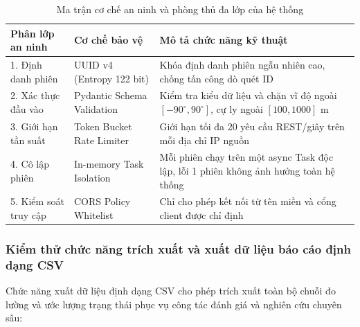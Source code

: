 \begin{table}[H]
\centering
\caption{Ma trận cơ chế an ninh và phòng thủ đa lớp của hệ thống}
\label{tab:security-mechanisms-matrix}
\begin{tabularx}{\linewidth}{ll>{\RaggedRight}X}
\toprule
\textbf{Phân lớp an ninh} & \textbf{Cơ chế bảo vệ} & \textbf{Mô tả chức năng kỹ thuật} \\
\midrule
1. Định danh phiên & UUID v4 (Entropy 122 bit) & Khóa định danh phiên ngẫu nhiên cao, chống tấn công dò quét ID \\
2. Xác thực đầu vào & Pydantic Schema Validation & Kiểm tra kiểu dữ liệu và chặn vĩ độ ngoài $[-90^\circ, 90^\circ]$, cự ly ngoài $[100, 1000]$ m \\
3. Giới hạn tần suất & Token Bucket Rate Limiter & Giới hạn tối đa 20 yêu cầu REST/giây trên mỗi địa chỉ IP nguồn \\
4. Cô lập phiên & In-memory Task Isolation & Mỗi phiên chạy trên một async Task độc lập, lỗi 1 phiên không ảnh hưởng toàn hệ thống \\
5. Kiểm soát truy cập & CORS Policy Whitelist & Chỉ cho phép kết nối từ tên miền và cổng client được chỉ định \\
\bottomrule
\end{tabularx}
\end{table}



\subsubsection{Kiểm thử chức năng trích xuất và xuất dữ liệu báo cáo định dạng CSV}

\hspace{0.5cm} Chức năng xuất dữ liệu định dạng CSV cho phép trích xuất toàn bộ chuỗi đo lường và ước lượng trạng thái phục vụ công tác đánh giá và nghiên cứu chuyên sâu:

\begin{table}[H]
\centering
\caption{Kiểm tra tính toàn vẹn và dung lượng tệp CSV xuất theo thời lượng phiên mô phỏng}
\label{tab:csv-export-integrity}
\end{table}


